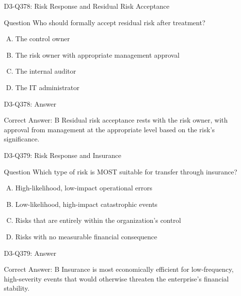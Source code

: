 \documentclass{beamer}
\begin{document}
\begin{frame}{D3-Q378: Risk Response and Residual Risk Acceptance}
	\begin{block}{Question}
		Who should formally accept residual risk after treatment?
	\end{block}
	\begin{enumerate}[(A)]
		\item The control owner
		\item The risk owner with appropriate management approval
		\item The internal auditor
		\item The IT administrator
	\end{enumerate}
\end{frame}
\begin{frame}{D3-Q378: Answer}
	\begin{block}{Correct Answer: B}
		Residual risk acceptance rests with the risk owner, with approval from management at the appropriate level based on the risk's significance.
	\end{block}
\end{frame}

\begin{frame}{D3-Q379: Risk Response and Insurance}
	\begin{block}{Question}
		Which type of risk is MOST suitable for transfer through insurance?
	\end{block}
	\begin{enumerate}[(A)]
		\item High-likelihood, low-impact operational errors
		\item Low-likelihood, high-impact catastrophic events
		\item Risks that are entirely within the organization's control
		\item Risks with no measurable financial consequence
	\end{enumerate}
\end{frame}
\begin{frame}{D3-Q379: Answer}
	\begin{block}{Correct Answer: B}
		Insurance is most economically efficient for low-frequency, high-severity events that would otherwise threaten the enterprise's financial stability.
	\end{block}
\end{frame}
\end{document}
